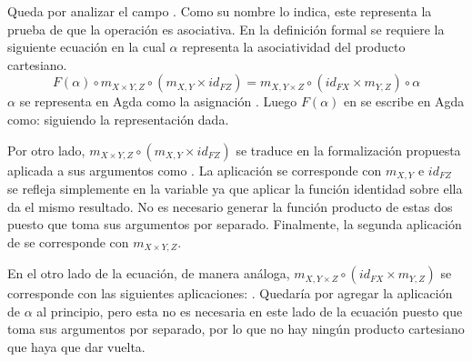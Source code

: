 Queda por analizar el campo . Como su nombre lo indica, este representa la prueba de que la operación  es asociativa. En la definición formal se requiere la siguiente ecuación en la cual $\alpha$ representa la asociatividad del producto cartesiano.
\begin{equation*}
\mathit{F}(\alpha) \circ m_{X \times Y, Z} \circ (m_{X,Y} \times id_{\mathit{F}Z}) = m_{X, Y \times Z} \circ (id_{\mathit{F}X} \times m_{Y,Z}) \circ \alpha
\end{equation*}
$\alpha$ se representa en Agda como la asignación \AgdaSymbol{($\lambda \{$((} \AgdaInductiveConstructor{,} \AgdaSymbol{)} \AgdaInductiveConstructor{,} \AgdaSymbol{) $\rightarrow$ (} \AgdaInductiveConstructor{,} \AgdaSymbol{(} \AgdaInductiveConstructor{,} \AgdaSymbol{))\})}. Luego $\mathit{F}(\alpha)$ en se escribe en Agda como: 
\AgdaSymbol{(} \AgdaSymbol{($\lambda \{$((} \AgdaInductiveConstructor{,} \AgdaSymbol{)} \AgdaInductiveConstructor{,} \AgdaSymbol{) $\rightarrow$ (} \AgdaInductiveConstructor{,} \AgdaSymbol{(} \AgdaInductiveConstructor{,} \AgdaSymbol{))\}))} siguiendo la representación dada.

Por otro lado, $m_{X \times Y, Z} \circ (m_{X,Y} \times id_{\mathit{F}Z})$ se traduce  en la formalización propuesta aplicada a sus argumentos como \AgdaSymbol{(} \AgdaSymbol{(} \AgdaSymbol{)} \AgdaSymbol{))}. La aplicación \AgdaSymbol{(} \AgdaSymbol{)} se corresponde con $m_{X,Y}$ e $id_{\mathit{F}Z}$ se refleja simplemente en la variable  ya que aplicar la función identidad sobre ella da el mismo resultado. No es necesario generar la función producto de estas dos puesto que  toma sus argumentos por separado. Finalmente, la segunda aplicación de  se corresponde con $m_{X \times Y, Z}$.

En el otro lado de la ecuación, de manera análoga, $m_{X, Y \times Z} \circ (id_{\mathit{F}X} \times m_{Y,Z})$ se corresponde con las siguientes aplicaciones: \AgdaSymbol{(}  \AgdaSymbol{(} \AgdaSymbol{))}. Quedaría por agregar la aplicación de $\alpha$ al principio, pero esta no es necesaria en este lado de la ecuación puesto que  toma sus argumentos por separado, por lo que no hay ningún producto cartesiano que haya que dar vuelta.

